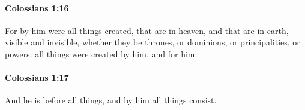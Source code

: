 		\paragraph{Colossians 1:16} %
			\label{COLOSSIANS-1-16}

			For by him were all things created, that are in heaven, and that are in earth, visible and invisible, whether they be thrones, or dominions, or principalities, or powers: all things were created by him, and for him:

			\begin{framed}
			\scriptsize
				\begin{compactdesc}
					\item[SBLG] 
				\end{compactdesc}
			\end{framed}

		\paragraph{Colossians 1:17} %
			\label{COLOSSIANS-1-17}

			And he is before all things, and by him all things consist.

